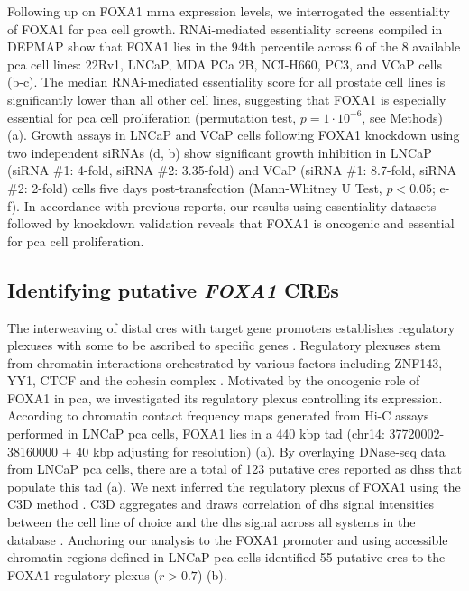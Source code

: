 Following up on FOXA1 \gls{mrna} expression levels, we interrogated the essentiality of FOXA1 for \gls{pca} cell growth.
RNAi-mediated essentiality screens compiled in DEPMAP show that FOXA1 lies in the 94th percentile across 6 of the 8 available \gls{pca} cell lines: 22Rv1, LNCaP, MDA PCa 2B, NCI-H660, PC3, and VCaP cells (b-c).
The median RNAi-mediated essentiality score for all prostate cell lines is significantly lower than all other cell lines, suggesting that FOXA1 is especially essential for \gls{pca} cell proliferation (permutation test, $p = 1 \cdot 10^{-6}$, see Methods) (a).
Growth assays in LNCaP and VCaP cells following FOXA1 knockdown using two independent siRNAs (d, b) show significant growth inhibition in LNCaP (siRNA \#1: 4-fold, siRNA \#2: 3.35-fold) and VCaP (siRNA \#1: 8.7-fold, siRNA \#2: 2-fold) cells five days post-transfection (Mann-Whitney U Test, $p<0.05$; e-f).
In accordance with previous reports, our results using essentiality datasets followed by knockdown validation reveals that FOXA1 is oncogenic and essential for \gls{pca} cell proliferation.

\subsection{Identifying putative \emph{FOXA1} CREs}

The interweaving of distal \glspl{cre} with target gene promoters establishes regulatory plexuses with some to be ascribed to specific genes \cite{sallariConvergenceDispersedRegulatory2016,baileyNoncodingSomaticInherited2016}.
Regulatory plexuses stem from chromatin interactions orchestrated by various factors including ZNF143, YY1, CTCF and the cohesin complex \cite{phillipsCTCFMasterWeaver2009,weintraubYY1StructuralRegulator2017,baileyZNF143ProvidesSequence2015}.
Motivated by the oncogenic role of FOXA1 in \gls{pca}, we investigated its regulatory plexus controlling its expression.
According to chromatin contact frequency maps generated from Hi-C assays performed in LNCaP \gls{pca} cells, FOXA1 lies in a 440 \gls{kbp} \gls{tad} (chr14: 37720002-38160000 $\pm$ 40 \gls{kbp} adjusting for resolution) (a).
By overlaying DNase-seq data from LNCaP \gls{pca} cells, there are a total of 123 putative \glspl{cre} reported as \glspl{dhs} that populate this \gls{tad} (a).
We next inferred the regulatory plexus of FOXA1 using the C3D method \cite{mehdiC3DToolPredict2019}.
C3D aggregates and draws correlation of \gls{dhs} signal intensities between the cell line of choice and the \gls{dhs} signal across all systems in the database \cite{mehdiC3DToolPredict2019}.
Anchoring our analysis to the FOXA1 promoter and using accessible chromatin regions defined in LNCaP \gls{pca} cells identified 55 putative \glspl{cre} to the FOXA1 regulatory plexus ($r > 0.7$) (b).

